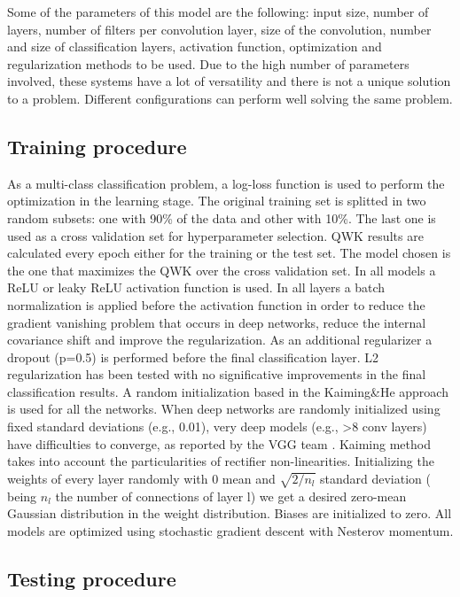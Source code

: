 Some of the parameters of this model are the following: input size, number of layers, number of filters per convolution layer, size of the convolution, number and size of classification layers, activation function, optimization and regularization methods to be used. Due to the high number of parameters involved, these systems have a lot of versatility and there is not a unique solution to a problem. Different configurations can perform well solving the same problem.

\subsection{Training procedure}

As a multi-class classification problem, a log-loss function is used to perform the optimization in the learning stage. The original training set is splitted in two random subsets: one with 90\% of the data and other with 10\%. The last one is used as a cross validation set for hyperparameter selection.  QWK results are calculated every epoch either for the training or the test set. The model chosen is the one that maximizes the QWK over the cross validation set. In all models a ReLU or leaky ReLU \citep{Dahl2013} activation function is used. In all layers a batch normalization \citep{batch-norm} is applied before the activation function in order to reduce the gradient vanishing problem that occurs in deep networks, reduce the internal covariance shift and improve the regularization. As an additional regularizer a dropout \citep{baldi2013} (p=0.5) is performed before the final classification layer. L2 regularization has been tested with no significative improvements in the final classification results. A random initialization based in the Kaiming\&He approach \citep{kaiming} is used for all the networks. When deep networks are randomly initialized using fixed standard deviations (e.g., 0.01), very deep models (e.g., >8 conv layers) have difficulties to converge, as reported by the VGG team \citep{DBLP:journals/corr/SimonyanZ14a}. Kaiming method takes into account the particularities of rectifier non-linearities. Initializing the weights of every layer randomly with 0 mean and $\sqrt{2/n_l}$ standard deviation ( being $n_l$ the number of connections of layer l) we get a desired zero-mean Gaussian distribution in the weight distribution. Biases are initialized to zero. All models are optimized using stochastic gradient descent with Nesterov momentum.

\subsection{Testing procedure}

